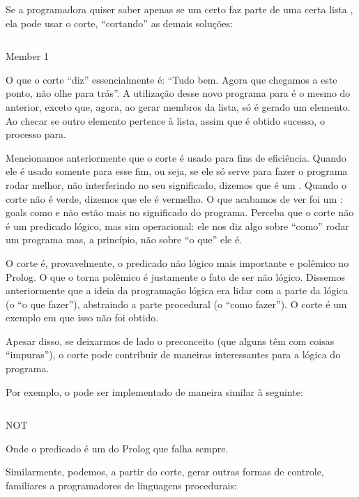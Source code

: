 Se a programadora quiser saber apenas se um certo  faz parte de
uma certa lista , ela pode usar o corte, ``cortando'' as
demais soluções:

\begin{listing}
  \inputminted{prolog}{../Exemplos/Cap4/prog2_member2.pl}
  \caption{Member 1}
\end{listing}

O que o corte ``diz'' essencialmente é: ``Tudo bem. Agora que chegamos
a este ponto, não olhe para trás''. A utilização desse novo programa
para  é o mesmo do anterior, exceto que, agora, ao
gerar membros da lista, só é gerado um elemento. Ao checar se outro
elemento pertence à lista, assim que é obtido sucesso, o processo
para.

Mencionamos anteriormente que o corte é usado para fins de
eficiência. Quando ele é usado somente para esse fim, ou seja, se ele
só serve para fazer o programa rodar melhor, não interferindo no seu
significado, dizemos que é um .  Quando o corte
não é verde, dizemos que ele é vermelho. O que acabamos de ver foi um
: goals como  e
 não estão mais no significado do programa. Perceba que
o corte não é um predicado lógico, mas sim operacional: ele nos diz
algo sobre ``como'' rodar um programa mas, a princípio, não sobre ``o
que'' ele é.

O corte é, provavelmente, o predicado não lógico mais importante e
polêmico no Prolog. O que o torna polêmico é justamente o fato de ser
não lógico. Dissemos anteriormente que a ideia da programação lógica
era lidar com a parte da lógica (o ``o que fazer''), abstraindo a
parte procedural (o ``como fazer''). O corte é um exemplo em que isso
não foi obtido.

Apesar disso, se deixarmos de lado o preconceito (que alguns têm com
coisas ``impuras''), o corte pode
contribuir de maneiras interessantes para a lógica do programa.

Por exemplo, o  pode ser implementado de maneira similar
à seguinte:

\begin{listing}
  \inputminted{prolog}{../Exemplos/Cap4/prog3_not.pl}
  \caption{NOT}
\end{listing}

Onde o predicado  é um  do Prolog que
falha sempre.

Similarmente, podemos, a partir do corte, gerar outras formas de
controle, familiares a programadores de linguagens procedurais:

